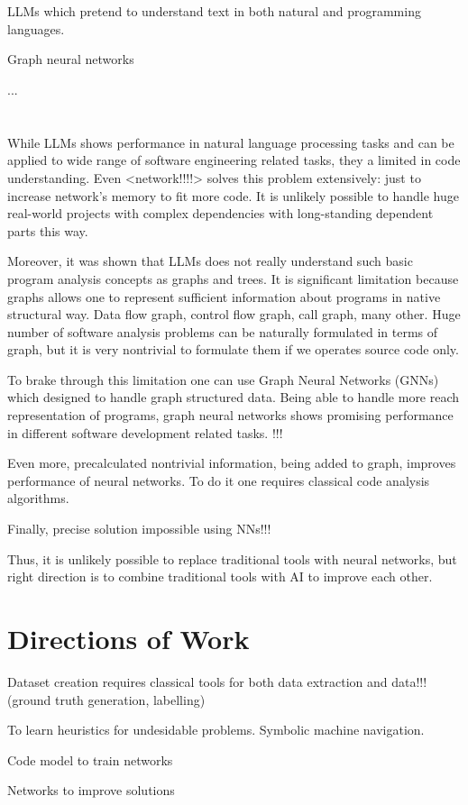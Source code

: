\section{}

LLMs which pretend to understand text in both natural and programming languages.

Graph neural networks

...

\section{}

While LLMs shows performance in natural language processing tasks and can be applied to wide range of software engineering related tasks, they a limited in code understanding. Even <network!!!!> solves this problem extensively: just to increase network's memory to fit more code. It is unlikely possible to handle huge real-world projects with complex dependencies with long-standing dependent parts this way. 

Moreover, it was shown that LLMs does not really understand such basic program analysis concepts as graphs and trees. It is significant limitation because graphs allows one to represent sufficient information about programs in native structural way. Data flow graph, control flow graph, call graph, many other. Huge number of software analysis problems can be naturally formulated in terms of graph, but it is very nontrivial to formulate them if we operates source code only. 

To brake through this limitation one can use Graph Neural Networks (GNNs) which designed to handle graph structured data. Being able to handle more reach representation of programs, graph neural networks shows promising performance in different software development related tasks. !!!

Even more, precalculated nontrivial information, being added to graph, improves performance of neural networks. To do it one requires classical code analysis algorithms.

Finally, precise solution impossible using NNs!!!

Thus, it is unlikely possible to replace traditional tools with neural networks, but right direction is to combine traditional tools with AI to improve each other.

\section{Directions of Work}

Dataset creation requires classical tools for both data extraction and data!!! (ground truth generation, labelling) 

To learn heuristics for undesidable problems. Symbolic machine navigation. 



Code model to train networks

Networks to improve solutions